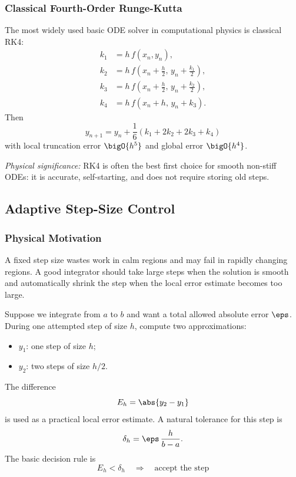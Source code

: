 \subsubsection{Classical Fourth-Order Runge-Kutta}
The most widely used basic ODE solver in computational physics is classical
RK4:
\begin{align}
    k_1 &= h\,f(x_n,y_n),
    \label{eq:lec06:rk4-k1}\\
    k_2 &= h\,f\left(x_n+\frac{h}{2},\,y_n+\frac{k_1}{2}\right),
    \label{eq:lec06:rk4-k2}\\
    k_3 &= h\,f\left(x_n+\frac{h}{2},\,y_n+\frac{k_2}{2}\right),
    \label{eq:lec06:rk4-k3}\\
    k_4 &= h\,f(x_n+h,\,y_n+k_3).
    \label{eq:lec06:rk4-k4}
\end{align}
Then
\begin{equation}
    \boxed{
    y_{n+1}
    =y_n+\frac{1}{6}\left(k_1+2k_2+2k_3+k_4\right)}
    \label{eq:lec06:rk4-update}
\end{equation}
with local truncation error $\bigO{h^5}$ and global error $\bigO{h^4}$.

\textit{Physical significance:} RK4 is often the best first choice for smooth
non-stiff ODEs: it is accurate, self-starting, and does not require storing
old steps.

\subsection{Adaptive Step-Size Control}\label{subsec:lec06:adaptive}

\subsubsection*{Physical Motivation}
A fixed step size wastes work in calm regions and may fail in rapidly
changing regions. A good integrator should take large steps when the solution
is smooth and automatically shrink the step when the local error estimate
becomes too large.

Suppose we integrate from $a$ to $b$ and want a total allowed absolute error
$\eps$. During one attempted step of size $h$, compute two approximations:
\begin{itemize}
    \item $y_{1}$: one step of size $h$;
    \item $y_{2}$: two steps of size $h/2$.
\end{itemize}
The difference
\begin{equation}
    E_h=\abs{y_2-y_1}
    \label{eq:lec06:adaptive-error-estimate}
\end{equation}
is used as a practical local error estimate. A natural tolerance for this
step is
\begin{equation}
    \delta_h=\eps\,\frac{h}{b-a}.
    \label{eq:lec06:local-tolerance}
\end{equation}
The basic decision rule is
\begin{equation}
    \boxed{
    E_h<\delta_h
    \quad\Longrightarrow\quad
    \text{accept the step}}
    \label{eq:lec06:accept-rule}
\end{equation}

